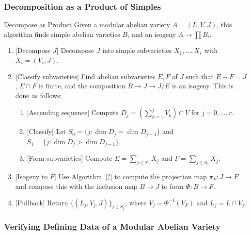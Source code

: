\documentclass{article}
\begin{document}
\subsubsection{Decomposition as a Product of Simples}


\begin{algorithm}{Decompose as Product}
    Given a modular abelian variety $A=(L, V, J)$, this algorithm finds simple
    abelian varieties $B_i$ and an isogeny $A\to \prod B_i$.
    \begin{enumerate}
        \item{} [Decompose $J$]
            Decompose $J$ into simple subvarieties $X_1,\ldots,X_r$ with
            $X_i=(V_i, J)$.
        \item{} [Classify subvarieties]
            Find abelian subvarieties $E, F$ of $J$ such that $E+F=J$, $E\cap
            F$ is finite, and the composition $B \to J \to J/E$ is an isogeny.
            This is done as follows:
            \begin{enumerate}
                \item{} [Ascending sequence]
                    Compute $D_j = \left(\sum_{k=1} ^j V_k \right)\cap V$ for
                    $j=0,\ldots,r$.
                \item{} [Classify]
                    Let $S_0 = \{j: \dim D_j = \dim D_{j-1}\}$ and $S_1 = \{j:
                    \dim D_j > \dim D_{j-1}\}$.
                \item{} [Form subvarieties]
                    Compute $E = \sum_{j \in S_0} X_j$ and $F = \sum_{j\in S_1}
                    X_j$.
            \end{enumerate}
        \item{} [Isogeny to $F$]
            Use Algorithm~\ref{?} to compute the projection map $\pi_F:J \to F$
            and compose this with the inclusion map $B\to J$ to form $\Phi:B\to
            F$.
        \item{} [Pullback]
            Return $\{(L_j, V_j, J)\}_{j\in S_1}$, where $V_j = \Phi^{-1}(V_F)$
            and $L_j = L\cap V_j$.
    \end{enumerate}
\end{algorithm}



\subsubsection{Verifying Defining Data of a Modular Abelian Variety}
\end{document}
